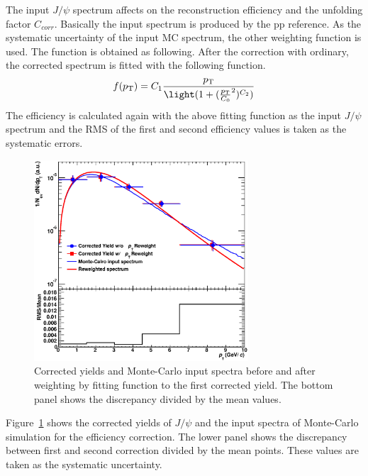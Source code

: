 The input $J/\psi$ spectrum affects on the reconstruction efficiency and the unfolding factor $C_{corr}$.
Basically the input spectrum is produced by the pp reference. 
As the systematic uncertainty of the input MC spectrum, the other weighting function is used. 
The function is obtained as following. 
After the correction with ordinary, the corrected spectrum is fitted with the following function. 
\begin{equation}
  f(p_{\rm{T}}) = C_{1}\frac{p_{\rm{T}}}{\light( 1+ (\frac{p_{\rm{T}}}{C_{0}}^{2})^{C_{2}})}
\end{equation}
The efficiency is calculated again with the above fitting function as the input $J/\psi$ spectrum and the RMS of the first and second efficiency values is taken as the systematic errors. 
\begin{figure}[!h]
  \centering
  \includegraphics[width=8cm]{chap4/figure/Correction/JpsiCorrYield_MCWeightDep_LHC13d10.eps}
  \caption{Corrected yields and Monte-Carlo input spectra before and after weighting by fitting function to the first corrected yield. The bottom panel shows the  discrepancy divided by the  mean values. }
  \label{fig_4_jpsieff_mcweight}
\end{figure}
Figure~\ref{fig_4_jpsieff_mcweight} shows the corrected yields of $J/\psi$ and the input spectra of Monte-Carlo simulation for the efficiency correction. 
The lower panel shows the discrepancy between first and second correction divided by the mean points. 
These values are taken as the systematic uncertainty.  



